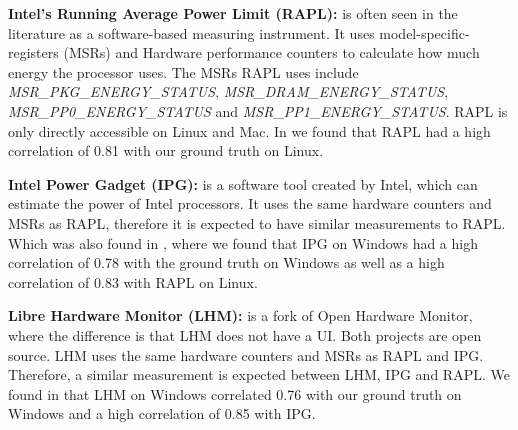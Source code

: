 \noindent\textbf{Intel's Running Average Power Limit (RAPL):} is often seen in the literature as a software-based measuring instrument.\cite{biksbois} It uses model-specific-registers (MSRs) and Hardware performance counters to calculate how much energy the processor uses. The MSRs RAPL uses include \textit{MSR\_PKG\_ENERGY\_STATUS}, \textit{MSR\_DRAM\_ENERGY\_STATUS}, \textit{MSR\_PP0\_ENERGY\_STATUS} and \textit{MSR\_PP1\_ENERGY\_STATUS}. %
RAPL is only directly accessible on Linux and Mac. In \cite{biksbois} we found that RAPL had a high correlation of 0.81 with our ground truth on Linux.\cite{biksbois}\newline

\noindent\textbf{Intel Power Gadget (IPG):} is a software tool created by Intel, which can estimate the power of Intel processors. %
It uses the same hardware counters and MSRs as RAPL\cite{FireFox}, therefore it is expected to have similar measurements to RAPL. Which was also found in \cite{biksbois}, where we found that IPG on Windows had a high correlation of 0.78 with the ground truth on Windows as well as a high correlation of 0.83 with RAPL on Linux.\cite{biksbois}\newline





\noindent\textbf{Libre Hardware Monitor (LHM):} is a fork of Open Hardware Monitor, where the difference is that LHM does not have a UI.\cite{LHM} Both projects are open source. LHM uses the same hardware counters and MSRs as RAPL and IPG. %
Therefore, a similar measurement is expected between LHM, IPG and RAPL. We found in \cite{biksbois} that LHM on Windows correlated 0.76 with our ground truth on Windows and a high correlation of 0.85 with IPG.\newline

